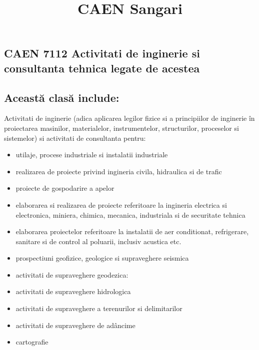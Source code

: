 \documentclass{article}
\title{CAEN Sangari}
\begin{document}
\maketitle

  \blindtext
{}
\begin{multicols}{3}
\columnbreak
\section*{CAEN 7112 Activitati de inginerie si consultanta tehnica legate de acestea}
\subsection*{Această clasă include:}
Activitati de inginerie (adica aplicarea legilor fizice si a principiilor de inginerie în proiectarea masinilor, materialelor, instrumentelor, structurilor, proceselor si sistemelor) si activitati de consultanta pentru:
\begin{itemize}
\item utilaje, procese industriale si instalatii industriale
\item realizarea de proiecte privind ingineria civila, hidraulica si de trafic
\item proiecte de gospodarire a apelor
\item elaborarea si realizarea de proiecte referitoare la ingineria electrica si electronica, miniera, chimica, mecanica, industriala si de securitate tehnica
\item elaborarea proiectelor referitoare la instalatii de aer conditionat, refrigerare, sanitare si de control al poluarii, inclusiv acustica etc.
\item prospectiuni geofizice, geologice si supraveghere seismica
\item activitati de supraveghere geodezica:
\item activitati de supraveghere hidrologica
\item activitati de supraveghere a terenurilor si delimitarilor
\item activitati de supraveghere de adâncime
\item cartografie
\end{itemize}



\end{multicols}
\end{document}
